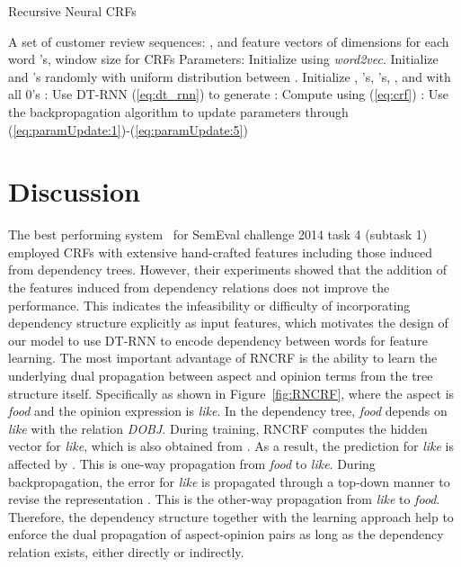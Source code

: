 \documentclass[11pt,letterpaper]{article}
\begin{document}
\begin{algorithm}[t!]
\footnotesize
\caption{Recursive Neural CRFs}\label{alg:rncrf}
	\begin{algorithmic}
		 A set of customer review sequences: , and feature vectors of  dimensions for each word 's, window size  for CRFs
		 Parameters: 
		 Initialize  using {\em word2vec}. Initialize  and 's randomly with uniform distribution between . Initialize , 's, 's, , and  with all 0's
		: Use DT-RNN (\ref{eq:dt_rnn}) to generate 
		: Compute  using (\ref{eq:crf})
		: Use the backpropagation algorithm to update parameters  through (\ref{eq:paramUpdate:1})-(\ref{eq:paramUpdate:5})
		\ENDFOR
	\end{algorithmic}
\end{algorithm}

\section{Discussion}
The best performing system~\cite{toh14} for SemEval challenge 2014 task 4 (subtask 1) employed CRFs with extensive hand-crafted features including those induced from dependency trees. However, their experiments showed that the addition of the features induced from dependency relations does not improve the performance. This indicates the infeasibility or difficulty of incorporating dependency structure explicitly as input features, which motivates the design of our model to use DT-RNN to encode dependency between words for feature learning. The most important advantage of RNCRF is the ability to learn the underlying dual propagation between aspect and opinion terms from the tree structure itself. Specifically as shown in Figure~\ref{fig:RNCRF}, where the aspect is \textit{food} and the opinion expression is \textit{like}. In the dependency tree, \textit{food} depends on \textit{like} with the relation \textit{DOBJ}. During training, RNCRF computes the hidden vector  for \textit{like}, which is also obtained from . As a result, the prediction for \textit{like} is affected by . This is one-way propagation from \textit{food} to \textit{like}. During backpropagation, the error for \textit{like} is propagated through a top-down manner to revise the representation . This is the other-way propagation from \textit{like} to \textit{food}. Therefore, the dependency structure together with the learning approach help to enforce the dual propagation of aspect-opinion pairs as long as the dependency relation exists, either directly or indirectly.
\end{document}
